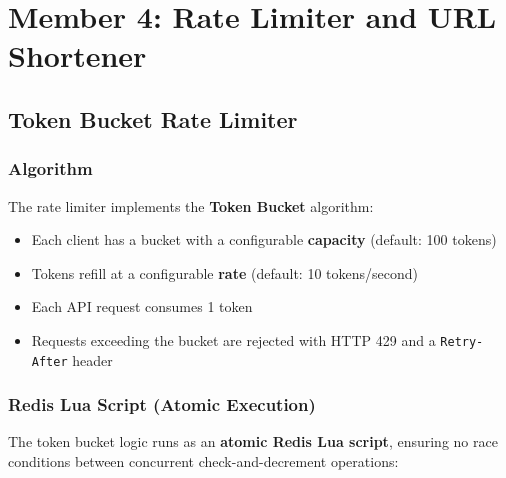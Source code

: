 \documentclass[12pt,a4paper]{report}
\begin{document}
\chapter{Member 4: Rate Limiter and URL Shortener}

\section{Token Bucket Rate Limiter}

\subsection{Algorithm}
The rate limiter implements the \textbf{Token Bucket} algorithm:
\begin{itemize}[noitemsep]
    \item Each client has a bucket with a configurable \textbf{capacity} (default: 100 tokens)
    \item Tokens refill at a configurable \textbf{rate} (default: 10 tokens/second)
    \item Each API request consumes 1 token
    \item Requests exceeding the bucket are rejected with HTTP 429 and a \texttt{Retry-After} header
\end{itemize}

\subsection{Redis Lua Script (Atomic Execution)}
The token bucket logic runs as an \textbf{atomic Redis Lua script}, ensuring no race conditions between concurrent check-and-decrement operations:
\end{document}
